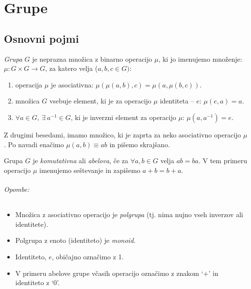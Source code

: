 \part{Grupe}

\chapter{Osnovni pojmi}

\begin{defin}
	\emph{Grupa} $G$ je neprazna mno\v zica z binarno operacijo $\mu$, ki jo imenujemo
	mno\v zenje: $\mu: G\times G \to G$, za katero velja ($a, b, c \in G)$:
	\begin{enumerate}
		\item{operacija $\mu$ je asociativna: $\mu(\mu(a,b), c) = \mu(a, \mu(b, c))$.}
		\item{mno\v zica $G$ vsebuje element, ki je za operacijo $\mu$ identiteta -- $e$: $\mu (e, a) = a$.}
		\item{$\forall a \in G,\ \exists\ a^{-1} \in G$, ki je inverzni element za operacijo $\mu$: $\mu (a, a^{-1}) = e$.}
	\end{enumerate}
\end{defin}

\ni Z drugimi besedami, imamo mno\v zico, ki je zaprta za neko asociativno operacijo $\mu$. Po navadi ena\v cimo $\mu (a, b) \equiv ab$
in pi\v semo skraj\v sano.

\begin{defin}
	Grupa $G$ je \emph{komutativna} ali \emph{abelova}, \v ce za $\forall a,b \in G$ velja $ab = ba$. V tem primeru
	operacijo $\mu$ imenujemo se\v stevanje in zapi\v semo $a + b = b + a$.
\end{defin}

\paragraph{Opombe:}
\begin{itemize}
	\item{Mno\v zica z asociativno operacijo je \emph{polgrupa} (tj. nima nujno vseh inverzov ali identitete).}
	\item{Polgrupa z enoto (identiteto) je \emph{monoid}.}
	\item{Identiteto, $e$, obi\v cajno ozna\v cimo z 1.}
	\item{V primeru abelove grupe v\v casih operacijo ozna\v cimo z znakom `$+$' in identiteto z `$0$'.}
\end{itemize}

